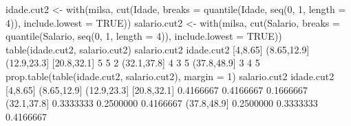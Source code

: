 \documentclass[
  10pt,
  a4paper]{book}
\newenvironment{Shaded}{\begin{snugshade}}{\end{snugshade}}
\newcommand{\AttributeTok}[1]{\textcolor[rgb]{0.77,0.63,0.00}{#1}}
\newcommand{\ConstantTok}[1]{\textcolor[rgb]{0.00,0.00,0.00}{#1}}
\newcommand{\DecValTok}[1]{\textcolor[rgb]{0.00,0.00,0.81}{#1}}
\newcommand{\FloatTok}[1]{\textcolor[rgb]{0.00,0.00,0.81}{#1}}
\newcommand{\FunctionTok}[1]{\textcolor[rgb]{0.00,0.00,0.00}{#1}}
\newcommand{\NormalTok}[1]{#1}
\newcommand{\OtherTok}[1]{\textcolor[rgb]{0.56,0.35,0.01}{#1}}
\begin{document}
\begin{Shaded}
\begin{Highlighting}[]
\NormalTok{idade.cut2 }\OtherTok{\textless{}{-}} \FunctionTok{with}\NormalTok{(milsa, }\FunctionTok{cut}\NormalTok{(Idade,}
                              \AttributeTok{breaks =} \FunctionTok{quantile}\NormalTok{(Idade, }\FunctionTok{seq}\NormalTok{(}\DecValTok{0}\NormalTok{, }\DecValTok{1}\NormalTok{, }\AttributeTok{length =} \DecValTok{4}\NormalTok{)),}
                              \AttributeTok{include.lowest =} \ConstantTok{TRUE}\NormalTok{))}
\NormalTok{salario.cut2 }\OtherTok{\textless{}{-}} \FunctionTok{with}\NormalTok{(milsa, }\FunctionTok{cut}\NormalTok{(Salario,}
                                \AttributeTok{breaks =} \FunctionTok{quantile}\NormalTok{(Salario, }\FunctionTok{seq}\NormalTok{(}\DecValTok{0}\NormalTok{, }\DecValTok{1}\NormalTok{, }\AttributeTok{length =} \DecValTok{4}\NormalTok{)),}
                                \AttributeTok{include.lowest =} \ConstantTok{TRUE}\NormalTok{))}
\FunctionTok{table}\NormalTok{(idade.cut2, salario.cut2)}
\NormalTok{             salario.cut2}
\NormalTok{idade.cut2    [}\DecValTok{4}\NormalTok{,}\FloatTok{8.65}\NormalTok{] (}\FloatTok{8.65}\NormalTok{,}\FloatTok{12.9}\NormalTok{] (}\FloatTok{12.9}\NormalTok{,}\FloatTok{23.3}\NormalTok{]}
\NormalTok{  [}\FloatTok{20.8}\NormalTok{,}\FloatTok{32.1}\NormalTok{]        }\DecValTok{5}           \DecValTok{5}           \DecValTok{2}
\NormalTok{  (}\FloatTok{32.1}\NormalTok{,}\FloatTok{37.8}\NormalTok{]        }\DecValTok{4}           \DecValTok{3}           \DecValTok{5}
\NormalTok{  (}\FloatTok{37.8}\NormalTok{,}\FloatTok{48.9}\NormalTok{]        }\DecValTok{3}           \DecValTok{4}           \DecValTok{5}
\FunctionTok{prop.table}\NormalTok{(}\FunctionTok{table}\NormalTok{(idade.cut2, salario.cut2), }\AttributeTok{margin =} \DecValTok{1}\NormalTok{)}
\NormalTok{             salario.cut2}
\NormalTok{idade.cut2     [}\DecValTok{4}\NormalTok{,}\FloatTok{8.65}\NormalTok{] (}\FloatTok{8.65}\NormalTok{,}\FloatTok{12.9}\NormalTok{] (}\FloatTok{12.9}\NormalTok{,}\FloatTok{23.3}\NormalTok{]}
\NormalTok{  [}\FloatTok{20.8}\NormalTok{,}\FloatTok{32.1}\NormalTok{] }\FloatTok{0.4166667}   \FloatTok{0.4166667}   \FloatTok{0.1666667}
\NormalTok{  (}\FloatTok{32.1}\NormalTok{,}\FloatTok{37.8}\NormalTok{] }\FloatTok{0.3333333}   \FloatTok{0.2500000}   \FloatTok{0.4166667}
\NormalTok{  (}\FloatTok{37.8}\NormalTok{,}\FloatTok{48.9}\NormalTok{] }\FloatTok{0.2500000}   \FloatTok{0.3333333}   \FloatTok{0.4166667}
\end{Highlighting}
\end{Shaded}
\end{document}
